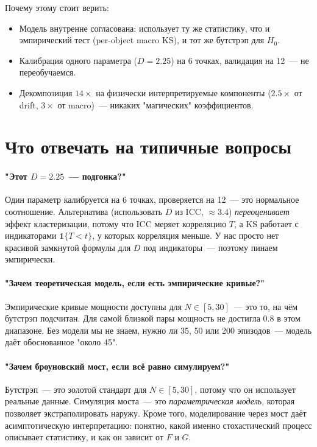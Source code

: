 \documentclass[11pt]{article}
\begin{document}
Почему этому стоит верить:
\begin{itemize}[leftmargin=2em, itemsep=2pt]
\item Модель внутренне согласована: использует ту же статистику, что и эмпирический тест (per-object macro KS), и тот же бутстрэп для $H_0$.
\item Калибрация одного параметра ($D = 2.25$) на 6 точках, валидация на 12~--- не переобучаемся.
\item Декомпозиция $14\times$ на физически интерпретируемые компоненты ($2.5\times$ от drift, $3\times$ от macro)~--- никаких "магических" коэффициентов.
\end{itemize}

\section{Что отвечать на типичные вопросы}

\paragraph{"Этот $D = 2.25$~--- подгонка?"}
Один параметр калибруется на 6 точках, проверяется на 12~--- это нормальное соотношение. Альтернатива (использовать $D$ из ICC, $\approx 3.4$) \emph{переоценивает} эффект кластеризации, потому что ICC меряет корреляцию $T$, а KS работает с индикаторами $\mathbf{1}\{T < t\}$, у которых корреляция меньше. У нас просто нет красивой замкнутой формулы для $D$ под индикаторы~--- поэтому пинаем эмпирически.

\paragraph{"Зачем теоретическая модель, если есть эмпирические кривые?"}
Эмпирические кривые мощности доступны для $N \in [5, 30]$~--- это то, на чём бутстрэп подсчитан. Для самой близкой пары мощность не достигла 0.8 в этом диапазоне. Без модели мы не знаем, нужно ли 35, 50 или 200 эпизодов~--- модель даёт обоснованное "около 45".

\paragraph{"Зачем броуновский мост, если всё равно симулируем?"}
Бутстрэп~--- это золотой стандарт для $N \in [5, 30]$, потому что он использует реальные данные. Симуляция моста~--- это \emph{параметрическая модель}, которая позволяет экстраполировать наружу. Кроме того, моделирование через мост даёт асимптотическую интерпретацию: понятно, какой именно стохастический процесс описывает статистику, и как он зависит от $F$ и $G$.
\end{document}
